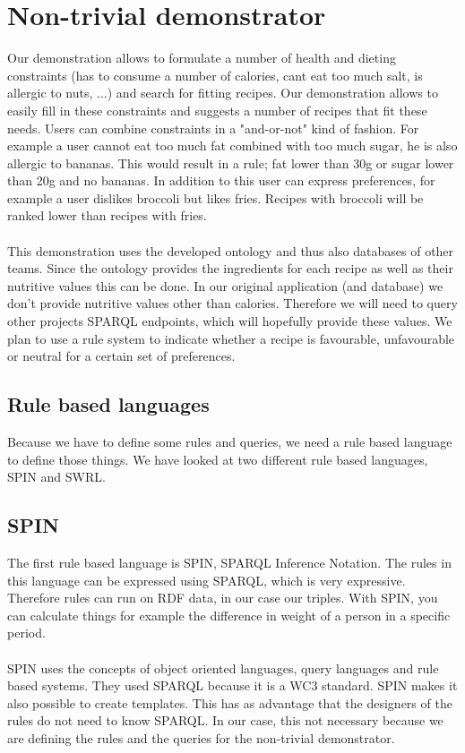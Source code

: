 \section{Non-trivial demonstrator}
Our demonstration allows to formulate a number of health and dieting constraints (has to consume a number of calories, cant eat too much salt, is allergic to nuts, ...) and search for fitting recipes. Our demonstration allows to easily fill in these constraints and suggests a number of recipes that fit these needs. Users can combine constraints in a "and-or-not" kind of fashion. For example a user cannot eat too much fat combined with too much sugar, he is also allergic to bananas. This would result in a rule; fat lower than 30g or sugar lower than 20g and no bananas. In addition to this user can express preferences, for example a user dislikes broccoli but likes fries. Recipes with broccoli will be ranked lower than recipes with fries.
\\ \\
This demonstration uses the developed ontology and thus also databases of other teams. Since the ontology provides the ingredients for each recipe as well as their nutritive values this can be done. In our original application (and database) we don't provide nutritive values other than calories. Therefore we will need to query other projects SPARQL endpoints, which will hopefully provide these values. We plan to use a rule system to indicate whether a recipe is favourable, unfavourable or neutral for a certain set of preferences.

\subsection{Rule based languages}
Because we have to define some rules and queries, we need a rule based language to define those things. We have looked at two different rule based languages, SPIN and SWRL.
\subsection*{SPIN}
The first rule based language is SPIN, SPARQL Inference Notation. The rules in this language can be expressed using SPARQL, which is very expressive. Therefore rules can run on RDF data, in our case our triples. With SPIN, you can calculate things for example the difference in weight of a person in a specific period. 
\\ \\ 
SPIN uses the concepts of object oriented languages, query languages and rule based systems. They used SPARQL because it is a WC3 standard. 
SPIN makes it also possible to create templates. This has as advantage that the designers of the rules do not need to know SPARQL. In our case, this not necessary because we are defining the rules and the queries for the non-trivial demonstrator. 

